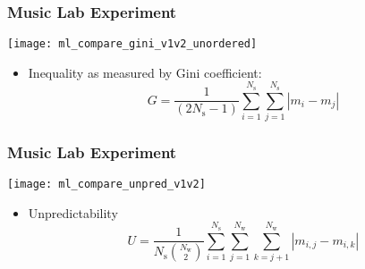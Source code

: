 


\begin{frame}
  \frametitle{Music Lab Experiment}
  \centering
  \texttt{[image: ml\_compare\_gini\_v1v2\_unordered]}

  \begin{itemize}
  \item Inequality as measured by Gini coefficient:
    $$
    G= \frac{1}{(2N_{\textrm{s}}-1)} \sum_{i=1}^{N_{\textrm{s}}} \sum_{j=1}^{N_{\textrm{s}}} | m_i - m_j |    
    $$
  \end{itemize}

\end{frame}

\begin{frame}
  \frametitle{Music Lab Experiment}
  \centering
  \texttt{[image: ml\_compare\_unpred\_v1v2]}

  \begin{itemize}
  \item  Unpredictability
    $$ 
    U = 
    \frac{1}
    {N_{\textrm{s}}\binom{N_{\textrm{w}}}{2}}
    \sum_{i=1}^{N_{\textrm{s}}}
    \sum_{j=1}^{N_{\textrm{w}}}
    \sum_{k=j+1}^{N_{\textrm{w}}}
    | m_{i,j} - m_{i,k} |  
    $$
  \end{itemize}

\end{frame}

